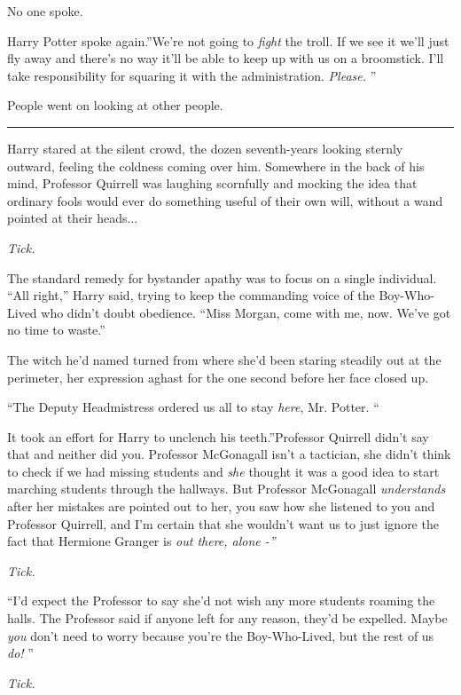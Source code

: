 No one spoke.

Harry Potter spoke again.''We're not going to \emph{fight} the troll. If
we see it we'll just fly away and there's no way it'll be able to keep
up with us on a broomstick. I'll take responsibility for squaring it
with the administration. \emph{Please.} ''

People went on looking at other people.

\begin{center}\rule{3in}{0.4pt}\end{center}

Harry stared at the silent crowd, the dozen seventh-years looking
sternly outward, feeling the coldness coming over him. Somewhere in the
back of his mind, Professor Quirrell was laughing scornfully and mocking
the idea that ordinary fools would ever do something useful of their own
will, without a wand pointed at their heads...

\emph{Tick.}

The standard remedy for bystander apathy was to focus on a single
individual. ``All right,'' Harry said, trying to keep the commanding
voice of the Boy-Who-Lived who didn't doubt obedience. ``Miss Morgan,
come with me, now. We've got no time to waste.''

The witch he'd named turned from where she'd been staring steadily out
at the perimeter, her expression aghast for the one second before her
face closed up.

``The Deputy Headmistress ordered us all to stay \emph{here}, Mr. Potter.
``

It took an effort for Harry to unclench his teeth.''Professor Quirrell
didn't say that and neither did you. Professor McGonagall isn't a
tactician, she didn't think to check if we had missing students and
\emph{she} thought it was a good idea to start marching students through
the hallways. But Professor McGonagall \emph{understands} after her
mistakes are pointed out to her, you saw how she listened to you and
Professor Quirrell, and I'm certain that she wouldn't want us to just
ignore the fact that Hermione Granger is \emph{out there, alone -''}

\emph{Tick.}

``I'd expect the Professor to say she'd not wish any more students
roaming the halls. The Professor said if anyone left for any reason,
they'd be expelled. Maybe \emph{you} don't need to worry because you're
the Boy-Who-Lived, but the rest of us \emph{do!} ''

\emph{Tick.}

